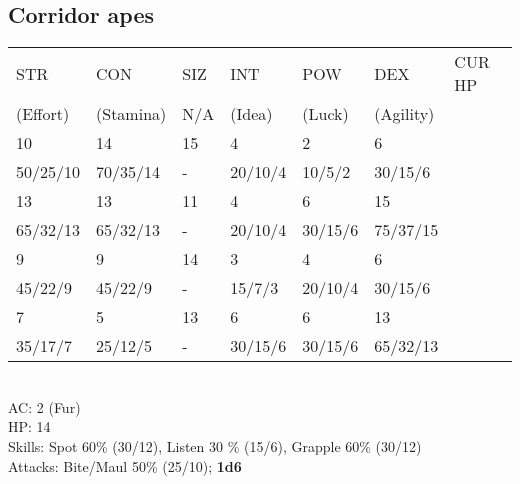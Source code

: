 \documentclass[12pt,a4paper]{article}
\begin{document}
\subsection*{Corridor apes}
\begin{tabular}{| l | l | l | l | l | l |l|}
\hline
STR      & CON       & SIZ & INT    & POW    & DEX       & CUR HP\\
(Effort) & (Stamina) & N/A & (Idea) & (Luck) & (Agility) & \\
\hline

10       & 14       & 15   & 4       & 2       & 6 &\\
50/25/10 & 70/35/14 & -    & 20/10/4 & 10/5/2  & 30/15/6 &\\

\rowcolor{lightgray}
13       & 13       & 11 & 4       & 6       & 15 &\\
\rowcolor{lightgray}
65/32/13 & 65/32/13 & -  & 20/10/4 & 30/15/6 & 75/37/15 &\\

9       & 9        & 14 & 3      & 4       & 6 & \\
45/22/9 & 45/22/9  & -  & 15/7/3 & 20/10/4 & 30/15/6 &\\

\rowcolor{lightgray}
7       & 5       & 13  & 6       & 6       & 13 &\\
\rowcolor{lightgray}
35/17/7 & 25/12/5 & -   & 30/15/6 & 30/15/6 & 65/32/13 &\\
\hline
\end{tabular}
\vspace{0.2cm}
\\
AC: 2 (Fur)\\
HP: 14\\
Skills: Spot 60\% (30/12), Listen 30 \% (15/6), Grapple 60\% (30/12)\\
Attacks: Bite/Maul 50\% (25/10); \textbf{1d6}
\end{document}
